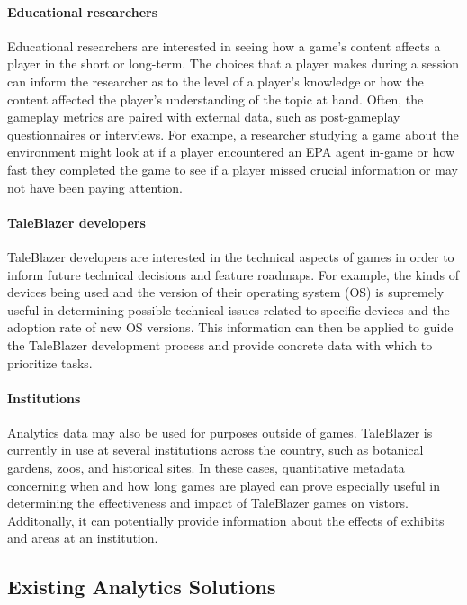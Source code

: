 \paragraph{Educational researchers}

Educational researchers are interested in seeing how a game's content affects a player in the short or long-term. The choices that a player makes during a session can inform the researcher as to the level of a player's knowledge or how the content affected the player's understanding of the topic at hand. Often, the gameplay metrics are paired with external data, such as post-gameplay questionnaires or interviews. For exampe, a researcher studying a game about the environment might look at if a player encountered an EPA agent in-game or how fast they completed the game to see if a player missed crucial information or may not have been paying attention.

\paragraph{TaleBlazer developers}

TaleBlazer developers are interested in the technical aspects of games in order to inform future technical decisions and feature roadmaps. For example, the kinds of devices being used and the version of their operating system (OS) is supremely useful in determining possible technical issues related to specific devices and the adoption rate of new OS versions. This information can then be applied to guide the TaleBlazer development process and provide concrete data with which to prioritize tasks. 

\paragraph{Institutions}

Analytics data may also be used for purposes outside of games. TaleBlazer is currently in use at several institutions across the country, such as botanical gardens, zoos, and historical sites. In these cases, quantitative metadata concerning when and how long games are played can prove especially useful in determining the effectiveness and impact of TaleBlazer games on vistors. Additonally, it can potentially provide information about the effects of exhibits and areas at an institution.

\subsection{Existing Analytics Solutions}

